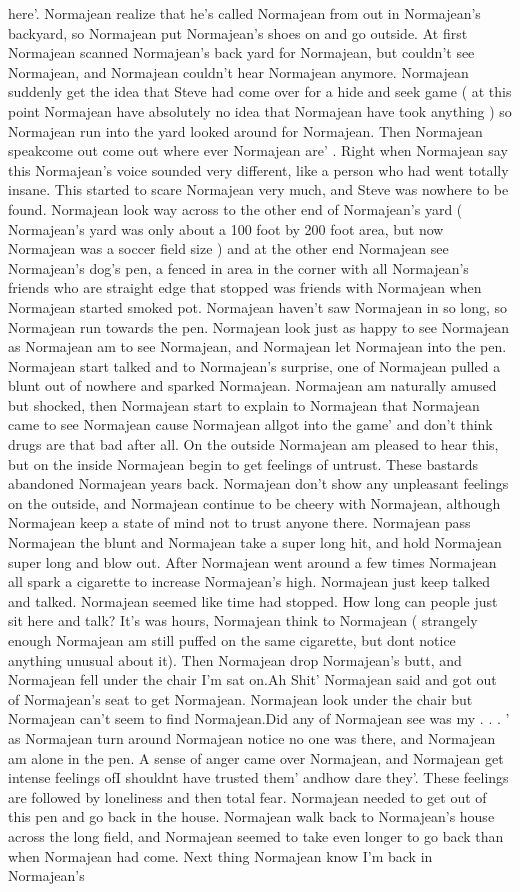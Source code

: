 \documentclass[12pt]{book}
\begin{document}
here'. Normajean realize that he's called Normajean from out in Normajean's backyard, so Normajean put Normajean's shoes on and go outside. At first Normajean scanned Normajean's back yard for Normajean, but couldn't see Normajean, and Normajean couldn't hear Normajean anymore. Normajean suddenly get the idea that Steve had come over for a hide and seek game ( at this point Normajean have absolutely no idea that Normajean have took anything ) so Normajean run into the yard looked around for Normajean. Then Normajean speakcome out come out where ever Normajean are' . Right when Normajean say this Normajean's voice sounded very different, like a person who had went totally insane. This started to scare Normajean very much, and Steve was nowhere to be found. Normajean look way across to the other end of Normajean's yard ( Normajean's yard was only about a 100 foot by 200 foot area, but now Normajean was a soccer field size ) and at the other end Normajean see Normajean's dog's pen, a fenced in area in the corner with all Normajean's friends who are straight edge that stopped was friends with Normajean when Normajean started smoked pot. Normajean haven't saw Normajean in so long, so Normajean run towards the pen. Normajean look just as happy to see Normajean as Normajean am to see Normajean, and Normajean let Normajean into the pen. Normajean start talked and to Normajean's surprise, one of Normajean pulled a blunt out of nowhere and sparked Normajean. Normajean am naturally amused but shocked, then Normajean start to explain to Normajean that Normajean came to see Normajean cause Normajean allgot into the game' and don't think drugs are that bad after all. On the outside Normajean am pleased to hear this, but on the inside Normajean begin to get feelings of untrust. These bastards abandoned Normajean years back. Normajean don't show any unpleasant feelings on the outside, and Normajean continue to be cheery with Normajean, although Normajean keep a state of mind not to trust anyone there. Normajean pass Normajean the blunt and Normajean take a super long hit, and hold Normajean super long and blow out. After Normajean went around a few times Normajean all spark a cigarette to increase Normajean's high. Normajean just keep talked and talked. Normajean seemed like time had stopped. How long can people just sit here and talk? It's was hours, Normajean think to Normajean ( strangely enough Normajean am still puffed on the same cigarette, but dont notice anything unusual about it). Then Normajean drop Normajean's butt, and Normajean fell under the chair I'm sat on.Ah Shit' Normajean said and got out of Normajean's seat to get Normajean. Normajean look under the chair but Normajean can't seem to find Normajean.Did any of Normajean see was my . . .  ' as Normajean turn around Normajean notice no one was there, and Normajean am alone in the pen. A sense of anger came over Normajean, and Normajean get intense feelings ofI shouldnt have trusted them' andhow dare they'. These feelings are followed by loneliness and then total fear. Normajean needed to get out of this pen and go back in the house. Normajean walk back to Normajean's house across the long field, and Normajean seemed to take even longer to go back than when Normajean had come. Next thing Normajean know I'm back in Normajean's 
\end{document}
